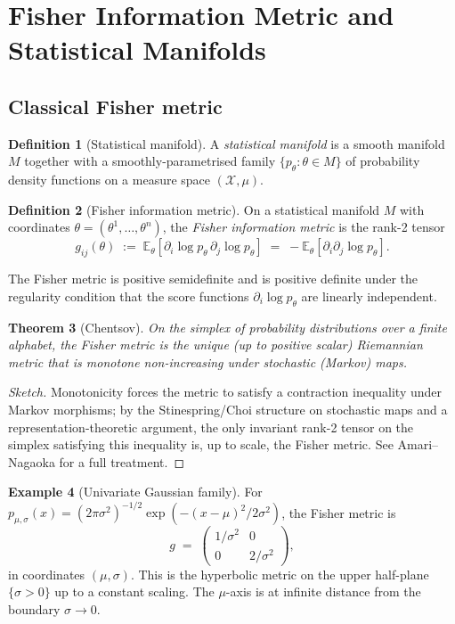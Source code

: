 \documentclass[12pt]{article}
\newtheorem{theorem}{Theorem}[section]
\theoremstyle{definition}
\newtheorem{definition}[theorem]{Definition}
\newtheorem{example}[theorem]{Example}
\theoremstyle{remark}
\begin{document}
\section{Fisher Information Metric and Statistical Manifolds}
\label{sec:fisher}

\subsection{Classical Fisher metric}

\begin{definition}[Statistical manifold]
\label{def:stat-manifold}
A \emph{statistical manifold} is a smooth manifold $M$ together with a smoothly-parametrised family $\{p_\theta : \theta \in M\}$ of probability density functions on a measure space $(\mathcal{X},\mu)$.
\end{definition}

\begin{definition}[Fisher information metric]
\label{def:fisher}
On a statistical manifold $M$ with coordinates $\theta = (\theta^1,\dots,\theta^n)$, the \emph{Fisher information metric} is the rank-2 tensor
\[
g_{ij}(\theta) \;:=\; \mathbb{E}_\theta\!\left[\partial_i \log p_\theta\, \partial_j \log p_\theta\right] \;=\; -\mathbb{E}_\theta\!\left[\partial_i \partial_j \log p_\theta\right].
\]
\end{definition}

The Fisher metric is positive semidefinite and is positive definite under the regularity condition that the score functions $\partial_i \log p_\theta$ are linearly independent.

\begin{theorem}[Chentsov]
\label{thm:chentsov}
On the simplex of probability distributions over a finite alphabet, the Fisher metric is the unique (up to positive scalar) Riemannian metric that is monotone non-increasing under stochastic (Markov) maps.
\end{theorem}

\begin{proof}[Sketch]
Monotonicity forces the metric to satisfy a contraction inequality under Markov morphisms; by the Stinespring/Choi structure on stochastic maps and a representation-theoretic argument, the only invariant rank-2 tensor on the simplex satisfying this inequality is, up to scale, the Fisher metric. See Amari--Nagaoka \cite{amari} for a full treatment.
\end{proof}

\begin{example}[Univariate Gaussian family]
\label{ex:gaussian-fisher}
For $p_{\mu,\sigma}(x) = (2\pi\sigma^2)^{-1/2} \exp(-(x-\mu)^2/2\sigma^2)$, the Fisher metric is
\[
g \;=\; \begin{pmatrix} 1/\sigma^2 & 0 \\ 0 & 2/\sigma^2 \end{pmatrix},
\]
in coordinates $(\mu,\sigma)$. This is the hyperbolic metric on the upper half-plane $\{\sigma > 0\}$ up to a constant scaling. The $\mu$-axis is at infinite distance from the boundary $\sigma \to 0$.
\end{example}
\end{document}

